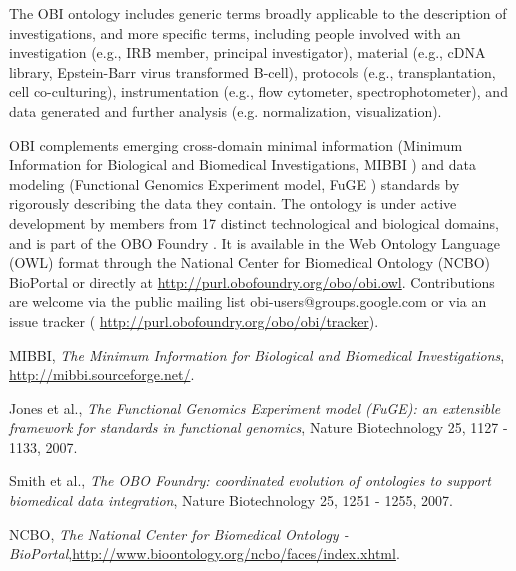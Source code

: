 \documentclass[a4paper]{article}
\begin{document}
The OBI ontology includes generic terms broadly applicable to the description of investigations, and more specific terms, including people involved with an investigation (e.g., IRB member, principal investigator), material (e.g., cDNA library, Epstein-Barr virus transformed B-cell), protocols (e.g., transplantation, cell co-culturing), instrumentation (e.g., flow cytometer, spectrophotometer), and data generated and further analysis (e.g. normalization, visualization).

OBI complements emerging cross-domain minimal information (Minimum Information for Biological and Biomedical Investigations, MIBBI \cite{MIBBI}) and data modeling (Functional Genomics Experiment model, FuGE \cite{FuGE}) standards by rigorously describing the data they contain.
The ontology is under active development by members from 17 distinct technological and biological domains, and is part of the OBO Foundry \cite{Smith}.  It is available in the Web Ontology Language (OWL) format through the National Center for Biomedical Ontology (NCBO) BioPortal \cite{NCBO} or directly at  \url{http://purl.obofoundry.org/obo/obi.owl}. Contributions are welcome via the public mailing list obi-users@groups.google.com or via an issue tracker ( \url{http://purl.obofoundry.org/obo/obi/tracker}).


\begin{thebibliography}{9}

 MIBBI, \emph{The Minimum Information for Biological and Biomedical Investigations}, \url{http://mibbi.sourceforge.net/}.

 Jones et al., \emph{ The Functional Genomics Experiment model (FuGE): an extensible
    framework for standards in functional genomics}, Nature Biotechnology 25, 1127 - 1133, 2007.

 Smith et al., \emph{The OBO Foundry: coordinated evolution of ontologies to support biomedical data integration}, Nature Biotechnology 25, 1251 - 1255, 2007.


 NCBO, \emph{The National Center for Biomedical Ontology - BioPortal},\url{http://www.bioontology.org/ncbo/faces/index.xhtml}.

\end{thebibliography}
\end{document}
